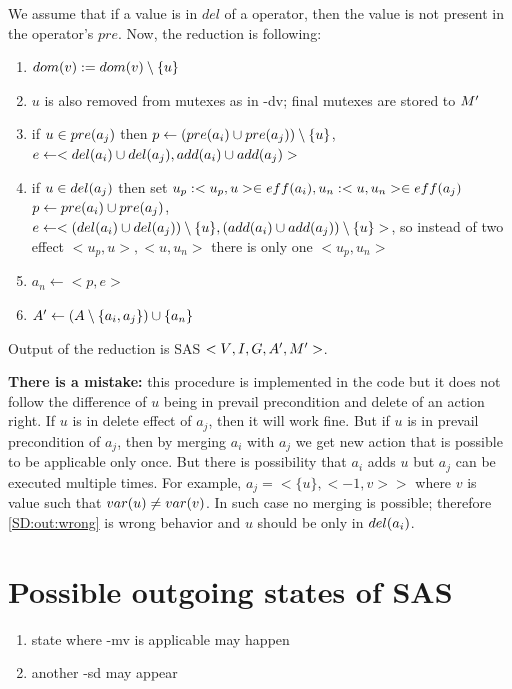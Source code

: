 	We assume that if a value is in $del$ of a operator, then the value is not present in the operator's $pre$. Now, the reduction is following:
	
	\begin{enumerate}
		\item $dom(v) := dom(v) \setminus \{u\}$ 
		\item $u$ is also removed from mutexes as in -dv; final mutexes are stored to $M{}'$
		\item if $u \in pre(a_j)$ then $p \leftarrow (pre(a_i) \cup pre(a_j)) \setminus \{u\}$, $e \leftarrow <del(a_i) \cup del(a_j), add(a_i) \cup add(a_j)>$ \label{SD:out:wrong}
		\item if $u \in del(a_j)$ then set $u_p : <u_p, u> \in eff(a_i), u_n : <u, u_n> \in eff(a_j)$ $p \leftarrow pre(a_i) \cup pre(a_j)$, $e \leftarrow <(del(a_i) \cup del(a_j)) \setminus \{u\}, (add(a_i) \cup add(a_j)) \setminus \{u\}>$, so instead of two effect $<u_p, u>, <u, u_n>$ there is only one $<u_p, u_n>$ \label{SD:out:inEffect}
		\item $a_n \leftarrow <p,e>$
		\item $A{}' \leftarrow (A \setminus \{a_i, a_j\}) \cup \{a_n\}$		
	\end{enumerate}
	
	Output of the reduction is SAS $<V{}, I{}, G{}, A{}', M{}'>$.
	
	
	\textbf{There is a mistake:} this procedure is implemented in the code but it does not follow the difference of $u$ being in prevail precondition and delete of an action right. If $u$ is in delete effect of $a_j$, then it will work fine. But if $u$ is in prevail precondition of $a_j$, then by merging $a_i$ with $a_j$ we get new action that is possible to be applicable only once. But there is possibility that $a_i$ adds $u$ but $a_j$ can be executed multiple times. For example, $a_j = <\{u\}, <-1,v>>$ where $v$ is value such that $var(u) \neq var(v)$. In such case no merging is possible; therefore \ref{SD:out:wrong} is wrong behavior and $u$ should be only in $del(a_i)$.
	
	\section{Possible outgoing states of SAS}
	\begin{enumerate}
		\item state where -mv is applicable may happen
		\item another -sd may appear
	\end{enumerate}
	

